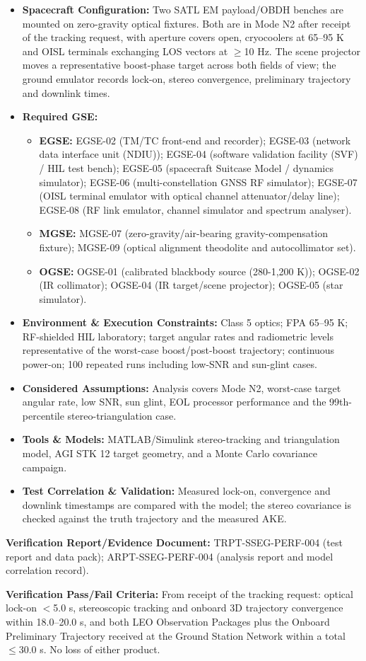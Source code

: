\begin{itemize}
\item \textbf{Spacecraft Configuration:} Two SATL EM payload/OBDH benches are mounted on zero-gravity optical fixtures. Both are in Mode N2 after receipt of the tracking request, with aperture covers open, cryocoolers at 65--95 K and OISL terminals exchanging LOS vectors at $\ge$10 Hz. The scene projector moves a representative boost-phase target across both fields of view; the ground emulator records lock-on, stereo convergence, preliminary trajectory and downlink times.
\item \textbf{Required GSE:}
\begin{itemize}
\item \textbf{EGSE:} EGSE-02 (TM/TC front-end and recorder); EGSE-03 (network data interface unit (NDIU)); EGSE-04 (software validation facility (SVF) / HIL test bench); EGSE-05 (spacecraft Suitcase Model / dynamics simulator); EGSE-06 (multi-constellation GNSS RF simulator); EGSE-07 (OISL terminal emulator with optical channel attenuator/delay line); EGSE-08 (RF link emulator, channel simulator and spectrum analyser).
\item \textbf{MGSE:} MGSE-07 (zero-gravity/air-bearing gravity-compensation fixture); MGSE-09 (optical alignment theodolite and autocollimator set).
\item \textbf{OGSE:} OGSE-01 (calibrated blackbody source (280-1,200 K)); OGSE-02 (IR collimator); OGSE-04 (IR target/scene projector); OGSE-05 (star simulator).
\end{itemize}
\item \textbf{Environment \& Execution Constraints:} Class 5 optics; FPA 65--95 K; RF-shielded HIL laboratory; target angular rates and radiometric levels representative of the worst-case boost/post-boost trajectory; continuous power-on; 100 repeated runs including low-SNR and sun-glint cases.
\item \textbf{Considered Assumptions:} Analysis covers Mode N2, worst-case target angular rate, low SNR, sun glint, EOL processor performance and the 99th-percentile stereo-triangulation case.
\item \textbf{Tools \& Models:} MATLAB/Simulink stereo-tracking and triangulation model, AGI STK 12 target geometry, and a Monte Carlo covariance campaign.
\item \textbf{Test Correlation \& Validation:} Measured lock-on, convergence and downlink timestamps are compared with the model; the stereo covariance is checked against the truth trajectory and the measured AKE.
\end{itemize}
\par\textbf{Verification Report/Evidence Document:} TRPT-SSEG-PERF-004 (test report and data pack); ARPT-SSEG-PERF-004 (analysis report and model correlation record).
\par\textbf{Verification Pass/Fail Criteria:} From receipt of the tracking request: optical lock-on $<$5.0 s, stereoscopic tracking and onboard 3D trajectory convergence within 18.0--20.0 s, and both LEO Observation Packages plus the Onboard Preliminary Trajectory received at the Ground Station Network within a total $\le$30.0 s. No loss of either product.
\par\medskip
